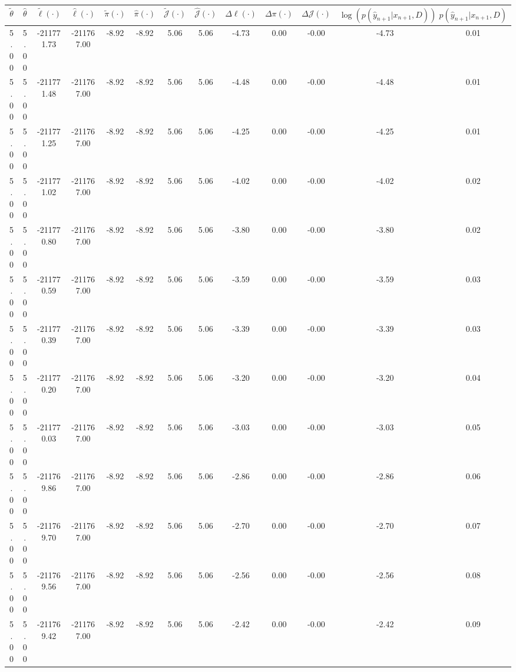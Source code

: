 \begin{table}[htbp]
        \centering
        \tiny
        \begin{adjustbox}{angle=90}
            \begin{tabular}{|c|c|c|c|c|c|c|c|c|c|c|c|c|}
                \hline
                 $\tilde{\theta}$ & $\hat{\theta}$ & $\tilde{\ell}(\cdot)$ & $\hat{\ell}(\cdot)$ & $\tilde{\pi}(\cdot)$ & $\hat{\pi}(\cdot)$ & $\tilde{\mathcal{J}}(\cdot)$ & $\hat{\mathcal{J}}(\cdot)$ & $\Delta \ell(\cdot)$ & $\Delta \pi(\cdot)$ & $\Delta \mathcal{J}(\cdot)$ & $\log(p(\hat{y}_{n+1}|x_{n+1}, D))$ & $p(\hat{y}_{n+1}|x_{n+1}, D)$ \\
                \hline
                 5.00 & 5.00 & -211771.73 & -211767.00 & -8.92 & -8.92 & 5.06 & 5.06 & -4.73 & 0.00 & -0.00 & -4.73 & 0.01\\ \hline
 5.00 & 5.00 & -211771.48 & -211767.00 & -8.92 & -8.92 & 5.06 & 5.06 & -4.48 & 0.00 & -0.00 & -4.48 & 0.01\\ \hline
 5.00 & 5.00 & -211771.25 & -211767.00 & -8.92 & -8.92 & 5.06 & 5.06 & -4.25 & 0.00 & -0.00 & -4.25 & 0.01\\ \hline
 5.00 & 5.00 & -211771.02 & -211767.00 & -8.92 & -8.92 & 5.06 & 5.06 & -4.02 & 0.00 & -0.00 & -4.02 & 0.02\\ \hline
 5.00 & 5.00 & -211770.80 & -211767.00 & -8.92 & -8.92 & 5.06 & 5.06 & -3.80 & 0.00 & -0.00 & -3.80 & 0.02\\ \hline
 5.00 & 5.00 & -211770.59 & -211767.00 & -8.92 & -8.92 & 5.06 & 5.06 & -3.59 & 0.00 & -0.00 & -3.59 & 0.03\\ \hline
 5.00 & 5.00 & -211770.39 & -211767.00 & -8.92 & -8.92 & 5.06 & 5.06 & -3.39 & 0.00 & -0.00 & -3.39 & 0.03\\ \hline
 5.00 & 5.00 & -211770.20 & -211767.00 & -8.92 & -8.92 & 5.06 & 5.06 & -3.20 & 0.00 & -0.00 & -3.20 & 0.04\\ \hline
 5.00 & 5.00 & -211770.03 & -211767.00 & -8.92 & -8.92 & 5.06 & 5.06 & -3.03 & 0.00 & -0.00 & -3.03 & 0.05\\ \hline
 5.00 & 5.00 & -211769.86 & -211767.00 & -8.92 & -8.92 & 5.06 & 5.06 & -2.86 & 0.00 & -0.00 & -2.86 & 0.06\\ \hline
 5.00 & 5.00 & -211769.70 & -211767.00 & -8.92 & -8.92 & 5.06 & 5.06 & -2.70 & 0.00 & -0.00 & -2.70 & 0.07\\ \hline
 5.00 & 5.00 & -211769.56 & -211767.00 & -8.92 & -8.92 & 5.06 & 5.06 & -2.56 & 0.00 & -0.00 & -2.56 & 0.08\\ \hline
 5.00 & 5.00 & -211769.42 & -211767.00 & -8.92 & -8.92 & 5.06 & 5.06 & -2.42 & 0.00 & -0.00 & -2.42 & 0.09\\ \hline

\end{tabular}
\end{adjustbox}
\end{table}

